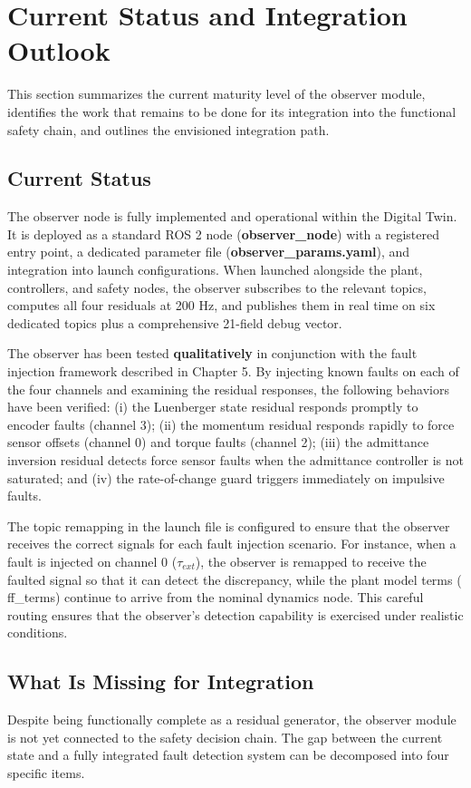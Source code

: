 \section{Current Status and Integration Outlook}
This section summarizes the current maturity level of the observer module, identifies the work that remains to be done for its integration into the functional safety chain, and outlines the envisioned integration path.

\subsection{Current Status}
The observer node is fully implemented and operational within the Digital Twin. It is deployed as a standard ROS 2 node (\textbf{observer\_node}) with a registered entry point, a dedicated parameter file (\textbf{observer\_params.yaml}), and integration into launch configurations. When launched alongside the plant, controllers, and safety nodes, the observer subscribes to the relevant topics, computes all four residuals at 200 Hz, and publishes them in real time on six dedicated topics plus a comprehensive 21-field debug vector.

The observer has been tested \textbf{qualitatively} in conjunction with the fault injection framework described in Chapter 5. By injecting known faults on each of the four channels and examining the residual responses, the following behaviors have been verified: (i) the Luenberger state residual responds promptly to encoder faults (channel 3); (ii) the momentum residual responds rapidly to force sensor offsets (channel 0) and torque faults (channel 2); (iii) the admittance inversion residual detects force sensor faults when the admittance controller is not saturated; and (iv) the rate-of-change guard triggers immediately on impulsive faults.

The topic remapping in the launch file is configured to ensure that the observer receives the correct signals for each fault injection scenario. For instance, when a fault is injected on channel 0 ($\tau_{ext}$), the observer is remapped to receive the faulted signal so that it can detect the discrepancy, while the plant model terms (
ff\_terms) continue to arrive from the nominal dynamics node. This careful routing ensures that the observer's detection capability is exercised under realistic conditions.

\subsection{What Is Missing for Integration}
Despite being functionally complete as a residual generator, the observer module is not yet connected to the safety decision chain. The gap between the current state and a fully integrated fault detection system can be decomposed into four specific items.

